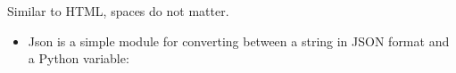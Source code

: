 \documentclass[letterpaper,10pt,english]{sphinxmanual}
\begin{document}
\begin{itemize}
\begin{sphinxVerbatim}[commandchars=\\\{\}]
\end{sphinxVerbatim}

Similar to HTML, spaces do not matter.
\begin{itemize}
\item {} 
Json is a simple module for converting between a string in
JSON format and a Python variable:

%
\begin{sphinxVerbatim}[commandchars=\\\{\}]
 
  \PYG{l+s+s1}{ [ }\PYG{l+s+s1}{, [ }\PYG{l+s+s1}{, 3 ] ] }
\end{sphinxVerbatim}

\end{itemize}

\end{itemize}
\end{document}
